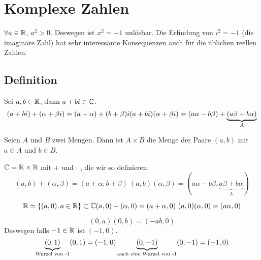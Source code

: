 \section{Komplexe Zahlen}
\begin{Bem}
  $\forall a\in \mathbb{R}$, $a^2>0$. Deswegen ist $x^2=-1$ unlösbar.
  Die Erfindung von $i^2=-1$ (die imaginäre Zahl) hat sehr interessante Konsequenzen auch für die üblichen reellen Zahlen.
\end{Bem}
\subsection{Definition}
\begin{Def}
  Sei $a,b\in\mathbb{R}$, dann $a+bi\in\mathbb{C}$.
  \begin{equation*}
    (a+bi)+(\alpha+\beta i) = (a+\alpha)+(b+\beta)i\\
    (a+bi)(\alpha+\beta i) = (a\alpha-b\beta)+\underbrace{(a\beta+b\alpha)}_{A}
  \end{equation*}
\end{Def}
\begin{Def}
  Seien $A$ und $B$ zwei Mengen. Dann ist $A\times B$ die Menge der Paare $(a,b)$ mit $a\in A$ und $b\in B$.
\end{Def}
\begin{Def}
  $\mathbb{C}=\mathbb{R}\times\mathbb{R}$ mit $+$ und $\cdot$ , die wir so definieren:
  \begin{equation*}
    (a,b)+(\alpha,\beta)=(a+\alpha,b+\beta)\
    (a,b)(\alpha,\beta)=(a\alpha-b\beta, \underbrace{a\beta+b\alpha}_{A})
  \end{equation*}
\end{Def}
\begin{Bem}
  \begin{equation*}
    \mathbb{R}\simeq \left\{ (a,0), a\in\mathbb{R} \right\}\subset\mathbb{C}\\
    (a,0)+(\alpha,0)=(a+\alpha,0)\
    (a,0)(\alpha,0)=(a\alpha,0)
  \end{equation*}
\end{Bem}
\begin{Bem}
  \begin{equation*}
    (0,a)(0,b)=(-ab, 0)
  \end{equation*}
  Deswegen falls $-1\in\mathbb{R}$ ist $(-1,0)$.
  \begin{equation*}
    \underbrace{(0,1)}_{\text{Wurzel von -1}}(0,1)=(-1,0)\\
    \underbrace{(0,-1)}_{\text{auch eine Wurzel von -1}}(0,-1)=(-1,0)
  \end{equation*}
\end{Bem}
